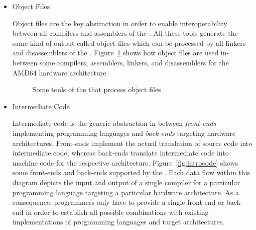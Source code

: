 \begin{itemize}

\item Object Files\nopagebreak

Object files are the key abstraction in order to enable interoperability between all compilers and assemblers of the \ecs{}.
All these tools generate the same kind of output called object files which can be processed by all linkers and disassemblers of the \ecs{}.
Figure~\ref{fig:introobject} shows how object files are used in-between some compilers, assemblers, linkers, and disassemblers for the AMD64 hardware architecture.
\seeobject

\begin{figure}
\caption{Some tools of the \ecs{} that process object files}
\label{fig:introobject}
\end{figure}

\item Intermediate Code\nopagebreak

Intermediate code is the generic abstraction in-between \emph{front-ends} implementing programming languages and \emph{back-ends} targeting hardware architectures.
Front-ends implement the actual translation of source code into intermediate code, whereas back-ends translate intermediate code into machine code for the respective architecture.
Figure~\ref{fig:introcode} shows some front-ends and back-ends supported by the \ecs{}.
Each data flow within this diagram depicts the input and output of a single compiler for a particular programming language targeting a particular hardware architecture.
As a consequence, programmers only have to provide a single front-end or back-end in order to establish all possible combinations with existing implementations of programming languages and target architectures.
\seecode


\end{itemize}

